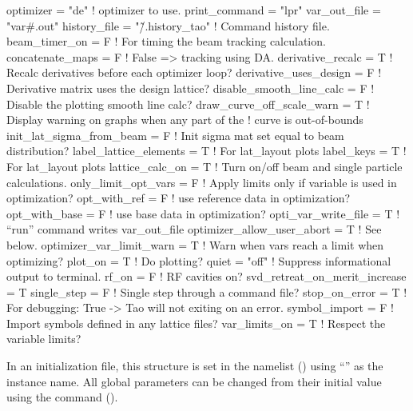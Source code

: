 {{{{{{{{\begin{example}
  optimizer     = "de"             ! optimizer to use.
  print_command = "lpr"
  var_out_file  = "var#.out"
  history_file = "\~/.history_tao"  ! Command history file.
  beam_timer_on = F                ! For timing the beam tracking calculation.
  concatenate_maps = F             ! False => tracking using DA.
  derivative_recalc = T            ! Recalc derivatives before each optimizer loop?
  derivative_uses_design = F       ! Derivative matrix uses the design lattice?
  disable_smooth_line_calc = F     ! Disable the plotting smooth line calc?
  draw_curve_off_scale_warn = T    ! Display warning on graphs when any part of the 
                                   !   curve is out-of-bounds
  init_lat_sigma_from_beam = F     ! Init sigma mat set equal to beam distribution? 
  label_lattice_elements = T       ! For lat_layout plots
  label_keys = T                   ! For lat_layout plots
  lattice_calc_on = T              ! Turn on/off beam and single particle calculations.
  only_limit_opt_vars = F          ! Apply limits only if variable is used in optimization?
  opt_with_ref = F                 ! use reference data in optimization?
  opt_with_base = F                ! use base data in optimization?
  opti_var_write_file = T          ! ``run'' command writes var_out_file
  optimizer_allow_user_abort = T   ! See below.
  optimizer_var_limit_warn = T     ! Warn when vars reach a limit when optimizing?
  plot_on = T                      ! Do plotting?
  quiet = "off"                    ! Suppress informational output to terminal.
  rf_on = F                        ! RF cavities on?
  svd_retreat_on_merit_increase = T    
  single_step = F                  ! Single step through a command file?
  stop_on_error = T                ! For debugging: True -> Tao will not exiting on an error.
  symbol_import = F                ! Import symbols defined in any lattice files?
  var_limits_on = T                ! Respect the variable limits?
\end{example}

In an initialization file, this structure is set in the  namelist ()
using ``'' as the instance name. All global parameters can be changed from their initial
value using the  command ().

}}}}}}}}
